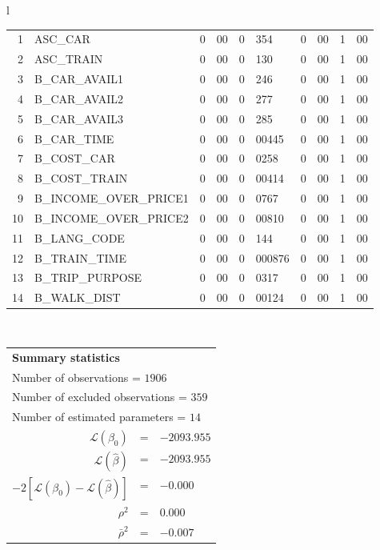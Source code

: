 \begin{tabular}{l}
\begin{tabular}{rlr@{.}lr@{.}lr@{.}lr@{.}l}
1 & ASC_CAR & 0&00 & 0&354 & 0&00 & 1&00\\
2 & ASC_TRAIN & 0&00 & 0&130 & 0&00 & 1&00\\
3 & B_CAR_AVAIL1 & 0&00 & 0&246 & 0&00 & 1&00\\
4 & B_CAR_AVAIL2 & 0&00 & 0&277 & 0&00 & 1&00\\
5 & B_CAR_AVAIL3 & 0&00 & 0&285 & 0&00 & 1&00\\
6 & B_CAR_TIME & 0&00 & 0&00445 & 0&00 & 1&00\\
7 & B_COST_CAR & 0&00 & 0&0258 & 0&00 & 1&00\\
8 & B_COST_TRAIN & 0&00 & 0&00414 & 0&00 & 1&00\\
9 & B_INCOME_OVER_PRICE1 & 0&00 & 0&0767 & 0&00 & 1&00\\
10 & B_INCOME_OVER_PRICE2 & 0&00 & 0&00810 & 0&00 & 1&00\\
11 & B_LANG_CODE & 0&00 & 0&144 & 0&00 & 1&00\\
12 & B_TRAIN_TIME & 0&00 & 0&000876 & 0&00 & 1&00\\
13 & B_TRIP_PURPOSE & 0&00 & 0&0317 & 0&00 & 1&00\\
14 & B_WALK_DIST & 0&00 & 0&00124 & 0&00 & 1&00\\
\hline
\end{tabular}
\\
\begin{tabular}{rcl}
\multicolumn{3}{l}{\bf Summary statistics}\\
\multicolumn{3}{l}{ Number of observations = $1906$} \\
\multicolumn{3}{l}{ Number of excluded observations = $359$} \\
\multicolumn{3}{l}{ Number of estimated  parameters = $14$} \\
 $\mathcal{L}(\beta_0)$ &=&  $-2093.955$ \\
 $\mathcal{L}(\hat{\beta})$ &=& $-2093.955 $  \\
 $-2[\mathcal{L}(\beta_0) -\mathcal{L}(\hat{\beta})]$ &=& $-0.000$ \\
    $\rho^2$ &=&   $0.000$ \\
    $\bar{\rho}^2$ &=&    $-0.007$ \\
\end{tabular}
  \end{tabular}
